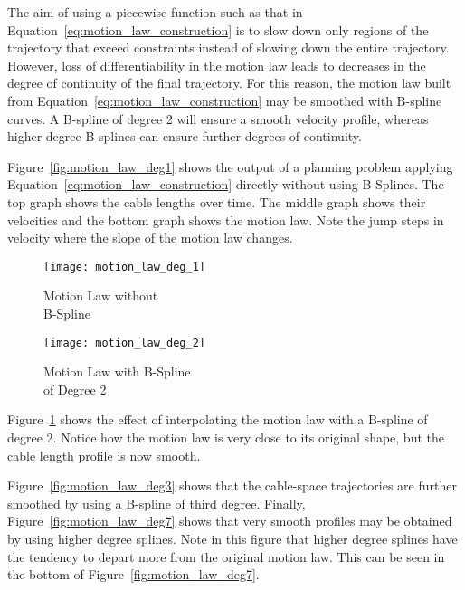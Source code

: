 	The aim of using a piecewise function such as that in
	Equation~\ref{eq:motion_law_construction} is to slow down only regions of
	the trajectory that exceed constraints instead of slowing down the entire
	trajectory. However, loss of differentiability in the motion law leads to
	decreases in the degree of continuity of the final trajectory. For this
	reason, the motion law built from Equation~\ref{eq:motion_law_construction}
	may be smoothed with B-spline curves. A B-spline of degree 2 will ensure a
	smooth velocity profile, whereas higher degree B-splines can ensure further
	degrees of continuity.

	Figure~\ref{fig:motion_law_deg1} shows the output of a planning problem
	applying Equation~\ref{eq:motion_law_construction} directly without using
	B-Splines. The top graph shows the cable lengths over time. The middle graph
	shows their velocities and the bottom graph shows the motion law. Note the
	jump steps in velocity where the slope of the motion law changes.

		\begin{figure}[hb]
			\begin{minipage}{0.5\columnwidth}
				\texttt{[image: motion\_law\_deg\_1]}
				\caption{Motion Law without\\\hspace{\textwidh} B-Spline}
				\label{fig:motion_law_deg1}
			\end{minipage}%
			\begin{minipage}{0.5\columnwidth}
				\texttt{[image: motion\_law\_deg\_2]}
				\caption{Motion Law with B-Spline\\\hspace{\textwidth} of Degree 2}
				\label{fig:motion_law_deg2}
			\end{minipage}
		\end{figure}

	Figure~\ref{fig:motion_law_deg2} shows the effect of interpolating the
	motion law with a B-spline of degree 2. Notice how the motion law is very
	close to its original shape, but the cable length profile is now smooth.

	Figure~\ref{fig:motion_law_deg3} shows that the cable-space trajectories are
	further smoothed by using a B-spline of third degree. Finally,
	Figure~\ref{fig:motion_law_deg7} shows that very smooth profiles may be
	obtained by using higher degree splines. Note in this figure that higher
	degree splines have the tendency to depart more from the original motion
	law. This can be seen in the bottom of Figure~\ref{fig:motion_law_deg7}.

